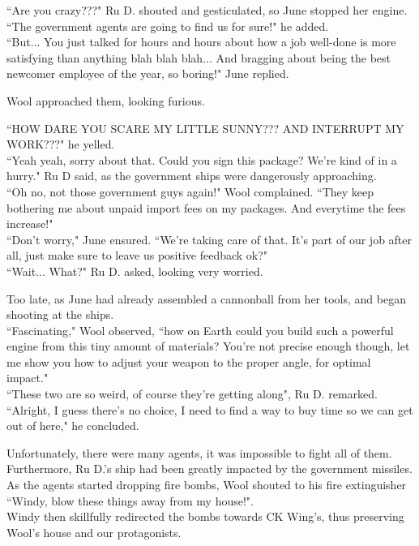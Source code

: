 ``Are you crazy???" Ru D. shouted and gesticulated, so June stopped her engine. ``The government agents are going to find us for sure!" he added.\\
``But... You just talked for hours and hours about how a job well-done is more satisfying than anything blah blah blah... And bragging about being the best newcomer employee of the year, so boring!" June replied.


Wool approached them, looking furious.

``HOW DARE YOU SCARE MY LITTLE SUNNY??? AND INTERRUPT MY WORK???" he yelled.\\
``Yeah yeah, sorry about that. Could you sign this package? We're kind of in a hurry." Ru D said, as the government ships were dangerously approaching.\\
``Oh no, not those government guys again!" Wool complained. ``They keep bothering me about unpaid import fees on my packages. And everytime the fees increase!"\\
``Don't worry," June ensured. ``We're taking care of that. It's part of our job after all, just make sure to leave us positive feedback ok?"\\
``Wait... What?" Ru D. asked, looking very worried.


Too late, as June had already assembled a cannonball from her tools, and began shooting at the ships.\\
``Fascinating," Wool observed, ``how on Earth could you build such a powerful engine from this tiny amount of materials? You're not precise enough though, let me show you how to adjust your weapon to the proper angle, for optimal impact."\\
``These two are so weird, of course they're getting along", Ru D. remarked. ``Alright, I guess there's no choice, I need to find a way to buy time so we can get out of here," he concluded.


Unfortunately, there were many agents, it was impossible to fight all of them. Furthermore, Ru D.'s ship had been greatly impacted by the government missiles.
As the agents started dropping fire bombs, Wool shouted to his fire extinguisher ``Windy, blow these things away from my house!". \\ 
Windy then skillfully redirected the bombs towards CK Wing's, thus preserving Wool's house and our protagonists.

